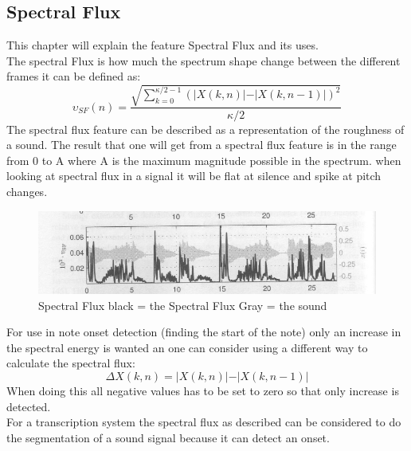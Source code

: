 \subsection{Spectral Flux}
This chapter will explain the feature Spectral Flux and its uses.\\
The spectral Flux is how much the spectrum shape change between the different frames it can be defined as\citep{ACA}:
\begin{equation}\label{Spectral Flux eq}
	\upsilon_{SF}(n) = \frac{\sqrt{\displaystyle\sum_{k=0}^{\kappa/2-1}(\vert X(k,n)\vert-\vert X(k,n-1)\vert)^2}}{\kappa/2}
\end{equation} 
The spectral flux feature can be described as a representation of the roughness of a sound. The result that one will get from a spectral flux feature is in the range from 0 to A where A is the maximum magnitude possible in the spectrum\citep{ACA}. when looking at spectral flux in a signal it will be flat at silence and spike at pitch changes\citep{ACA}.
\begin{figure}[h]
	\begin{center}
		\includegraphics[scale = 0.5]{fig/spectral_flux.jpg}
		\caption{Spectral Flux black = the Spectral Flux Gray = the sound \citep{ACA}}
		\label{Spectral flux pic}
	\end{center}
\end{figure}
For use in note onset detection (finding the start of the note) only an increase in the spectral energy is wanted an one can consider using a different way to calculate the spectral flux\citep{ACA}:
\begin{equation}
	\Delta X(k,n) = \vert X(k,n)\vert-\vert X(k,n-1)\vert
\end{equation}
When doing this all negative values has to be set to zero so that only increase is detected\citep{ACA}.
\\
For a transcription system the spectral flux as described can be considered to do the segmentation of a sound signal because it can detect an onset. 
 

